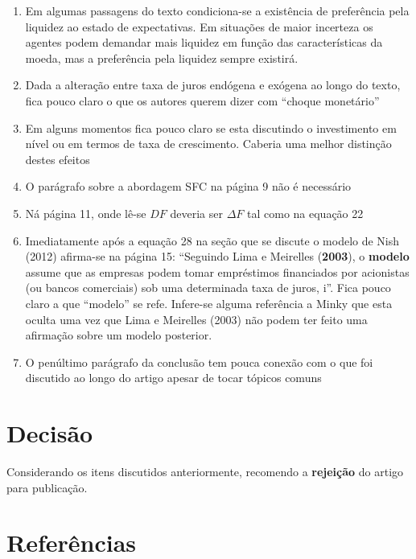 \documentclass[11pt]{article}
\begin{document}
\begin{enumerate}
\item Em algumas passagens do texto condiciona-se a existência de preferência pela liquidez ao estado de expectativas. Em situações de maior incerteza os agentes podem demandar mais liquidez em função das características da moeda, mas a preferência pela liquidez sempre existirá.
\item Dada a alteração entre taxa de juros endógena e exógena ao longo do texto, fica pouco claro o que os autores querem dizer com ``choque monetário''
\item Em alguns momentos fica pouco claro se esta discutindo o investimento em nível ou em termos de taxa de crescimento. Caberia uma melhor distinção destes efeitos
\item O parágrafo sobre a abordagem SFC na página 9 não é necessário
\item Ná página 11, onde lê-se \(DF\) deveria ser \(\Delta F\) tal como na equação 22
\item Imediatamente após a equação 28 na seção que se discute o modelo de Nish (2012) afirma-se na página 15: ``Seguindo Lima e Meirelles (\textbf{2003}), o \textbf{modelo} assume que as empresas podem tomar empréstimos financiados por acionistas (ou bancos comerciais) sob uma determinada taxa de juros, i''. Fica pouco claro a que ``modelo'' se refe. Infere-se alguma referência a Minky que esta oculta uma vez que Lima e Meirelles (2003) não podem ter feito uma afirmação sobre um modelo posterior.
\item O penúltimo parágrafo da conclusão tem pouca conexão com o que foi discutido ao longo do artigo apesar de tocar tópicos comuns
\end{enumerate}

\section*{Decisão}
\label{sec:org71c0724}


Considerando os itens discutidos anteriormente, recomendo a \textbf{rejeição} do artigo para publicação.

\section*{Referências}
\label{sec:org9cdb4d5}
\printbibliography[heading=none]
\end{document}

